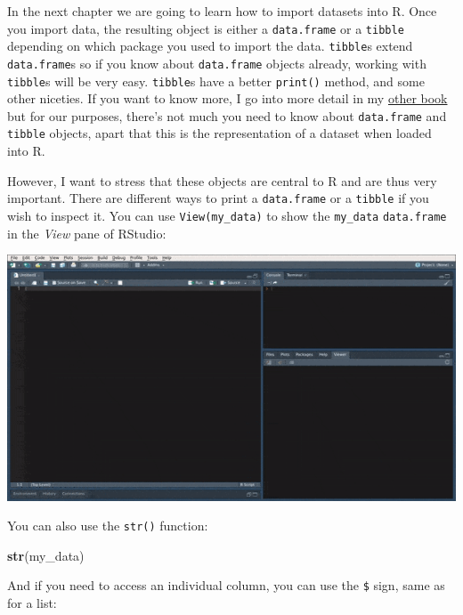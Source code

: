 \documentclass[]{gitbook}
\newenvironment{Shaded}{\begin{snugshade}}{\end{snugshade}}
\newcommand{\KeywordTok}[1]{\textcolor[rgb]{0.13,0.29,0.53}{\textbf{#1}}}
\newcommand{\NormalTok}[1]{#1}
\newcommand{\OperatorTok}[1]{\textcolor[rgb]{0.81,0.36,0.00}{\textbf{#1}}}
\theoremstyle{definition}
\theoremstyle{definition}
\theoremstyle{definition}
\theoremstyle{remark}
\begin{document}
In the next chapter we are going to learn how to import datasets into R.
Once you import data, the resulting object is either a
\texttt{data.frame} or a \texttt{tibble} depending on which package you
used to import the data. \texttt{tibble}s extend \texttt{data.frame}s so
if you know about \texttt{data.frame} objects already, working with
\texttt{tibble}s will be very easy. \texttt{tibble}s have a better
\texttt{print()} method, and some other niceties. If you want to know
more, I go into more detail in my
\href{https://b-rodrigues.github.io/fput/tidyverse.html\#getting-data-into-r-with-readr-readxl-haven-and-what-are-tibbles}{other
book} but for our purposes, there's not much you need to know about
\texttt{data.frame} and \texttt{tibble} objects, apart that this is the
representation of a dataset when loaded into R.

However, I want to stress that these objects are central to R and are
thus very important. There are different ways to print a
\texttt{data.frame} or a \texttt{tibble} if you wish to inspect it. You
can use \texttt{View(my\_data)} to show the \texttt{my\_data}
\texttt{data.frame} in the \emph{View} pane of RStudio:

\includegraphics{pics/rstudio_view_data.gif}

You can also use the \texttt{str()} function:

\begin{Shaded}
\begin{Highlighting}[]
\KeywordTok{str}\NormalTok{(my_data)}
\end{Highlighting}
\end{Shaded}

And if you need to access an individual column, you can use the
\texttt{\$} sign, same as for a list:

\begin{Shaded}
\end{Shaded}
\end{document}
